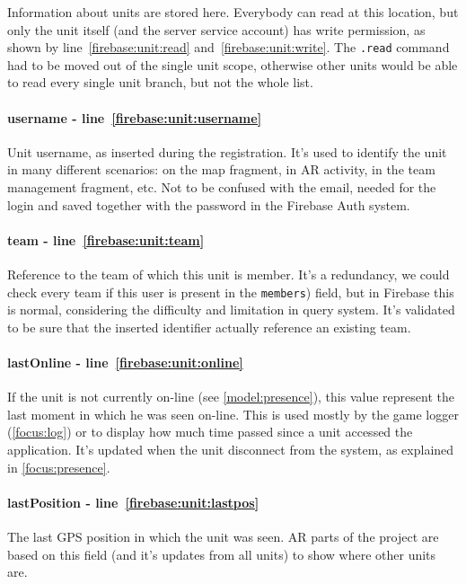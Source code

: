 				Information about units are stored here.
				Everybody can read at this location, but only the unit itself (and the server service account) has write permission, as shown by line~\ref{firebase:unit:read} and~\ref{firebase:unit:write}.
				The \lstinline|.read| command had to be moved out of the single unit scope, otherwise other units would be able to read every single unit branch, but not the whole list. \\
			
				\paragraph{username - line~\ref{firebase:unit:username}}
				Unit username, as inserted during the registration. It's used to identify the unit in many different scenarios: on the map fragment, in AR activity, in the team management fragment, etc. Not to be confused with the email, needed for the login and saved together with the password in the Firebase Auth system.
			
				\paragraph{team - line~\ref{firebase:unit:team}}
				Reference to the team of which this unit is member. It's a redundancy, we could check every team if this user is present in the \lstinline|members|) field, but in Firebase this is normal, considering the difficulty and limitation in query system.
				It's validated to be sure that the inserted identifier actually reference an existing team.
			
				\paragraph{lastOnline - line~\ref{firebase:unit:online}}
				If the unit is not currently on-line (see \autoref{model:presence}), this value represent the last moment in which he was seen on-line. This is used mostly by the game logger (\autoref{focus:log}) or to display how much time passed since a unit accessed the application. It's updated when the unit disconnect from the system, as explained in \autoref{focus:presence}.
				
				\paragraph{lastPosition - line~\ref{firebase:unit:lastpos}}
				The last GPS position in which the unit was seen. AR parts of the project are based on this field (and it's updates from all units) to show where other units are.
			
